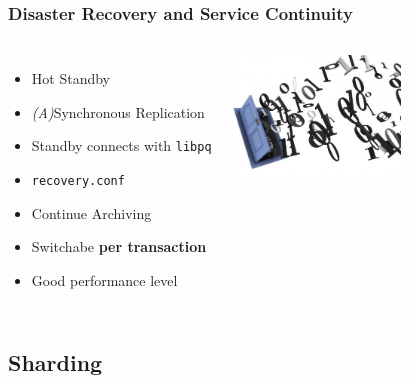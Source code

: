 \documentclass[english]{beamer}
\begin{document}
\begin{frame}[fragile]
  \frametitle{Disaster Recovery and Service Continuity}

  \vfill

\begin{columns}[c]

  \begin{itemize}
   \item<1-> \alert{Hot Standby}
   \item<2-> \textit{(A)}Synchronous Replication
   \item<2-> Standby connects with \texttt{libpq}
   \item<3-> \texttt{recovery.conf}
   \item<3-> Continue Archiving
   \item<3-> Switchabe \textbf{per transaction}
   \item<4-> Good performance level
  \end{itemize}  

\includegraphics[height=9em]{bits.jpeg}
\end{columns}
\end{frame}


\subsection{Sharding}
\frame{\tableofcontents[currentsubsection]}
\end{document}
